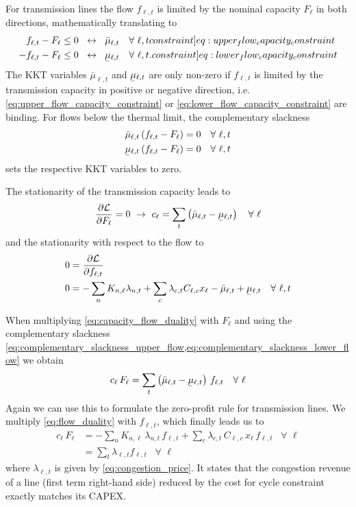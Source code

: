 \documentclass[11pt,twocolumn]{article}
\newcommand{\ubar}[1]{\underaccent{\bar}{#1}}
\newcommand{\resultsin}[1]{\hspace{6pt} \leftrightarrow  \hspace{6pt} #1}
\newcommand{\Forall}[1]{\hspace{10pt} \forall \,\, #1 }
\newcommand{\pdv}[2]{\frac{\partial #1}{\partial #2}}
\newcommand{\flow}{f_{\ell,t}}
\newcommand{\capacityflow}{F_{\ell}}
\newcommand{\capitalpriceflow}{c_{\ell}}
\newcommand{\mulowerflow}{\ubar{\mu}_{\ell,t}}
\newcommand{\muupperflow}{\bar{\mu}_{\ell,t}}
\newcommand{\lagrangian}{\mathcal{L}}
\newcommand{\lmp}[1][n]{\lambda_{#1,t}}
\newcommand{\incidence}[1][n]{K_{#1,\ell}}
\newcommand{\cycle}{C_{\ell,c}}
\newcommand{\reactance}{x_\ell}
\newcommand{\cycleprice}{\lambda_{c,t}}
\begin{document}
For transmission lines the flow $\flow$ is limited by the nominal capacity $\capacityflow$ in both directions, mathematically translating to 
\begin{align}
\flow - \capacityflow &\le 0 \resultsin{\muupperflow} \Forall{\ell,t} 
\label[constraint]{eq:upper_flow_capacity_constraint} \\
- \flow - \capacityflow &\le 0 \resultsin{\mulowerflow} \Forall{\ell,t} .
\label[constraint]{eq:lower_flow_capacity_constraint}
\end{align}
The \ac{KKT} variables $\muupperflow$ and $\mulowerflow$ are only non-zero if $\flow$ is limited by the transmission capacity in positive or negative direction, i.e. \cref{eq:upper_flow_capacity_constraint} or \cref{eq:lower_flow_capacity_constraint} are binding. For flows below the thermal limit, the complementary slackness 
\begin{align}
\muupperflow \left( \flow - \capacityflow \right)  &= 0 \Forall{\ell,t}
\label{eq:complementary_slackness_upper_flow} \\
\mulowerflow \left( \flow - \capacityflow \right) &=  0 \Forall{\ell,t}
\label{eq:complementary_slackness_lower_flow} 
\end{align}
sets the respective \ac{KKT} variables to zero. 

The stationarity of the transmission capacity leads to
\begin{align}
\pdv{\lagrangian}{\capacityflow} = 0 \,\, \rightarrow \,\, 
\capitalpriceflow =  \sum_t \left( \muupperflow - \mulowerflow \right) \Forall{\ell}
\label{eq:capacity_flow_duality}
\end{align}
and the stationarity with respect to the flow to
\begin{align}
    0 &= \pdv{\lagrangian}{\flow}  \\ 
    0 &= - \sum_n \incidence \lmp  + \sum_c \cycleprice \cycle \reactance  - \muupperflow + \mulowerflow \Forall{\ell, t} \label{eq:flow_duality}
\end{align}
    
    
When multiplying \cref{eq:capacity_flow_duality} with $\capacityflow$ and using the complementary slackness \cref{eq:complementary_slackness_upper_flow,eq:complementary_slackness_lower_flow} we obtain 
\begin{align}
 \capitalpriceflow \, \capacityflow = \sum_t \left( \muupperflow - \mulowerflow \right)  \, \flow \Forall{\ell} 
 \label{eq:capital_price_flow_sum}
\end{align}
Again we can use this to formulate the zero-profit rule for transmission lines. We multiply \cref{eq:flow_duality} with $\flow$, which finally leads us to 
\begin{align}
\capitalpriceflow \, \capacityflow &= - \sum_n \incidence\, \lmp\, \flow + \sum_c \cycleprice\, \cycle\, \reactance\, \flow 
\Forall{\ell} \\
&= \sum_t \lmp[\ell] \flow \Forall{\ell}
\end{align}
where $\lmp[\ell]$ is given by \cref{eq:congestion_price}.
It states that the congestion revenue of a line (first term right-hand side) reduced by the cost for cycle constraint exactly matches its \ac{CAPEX}. 
\end{document}
